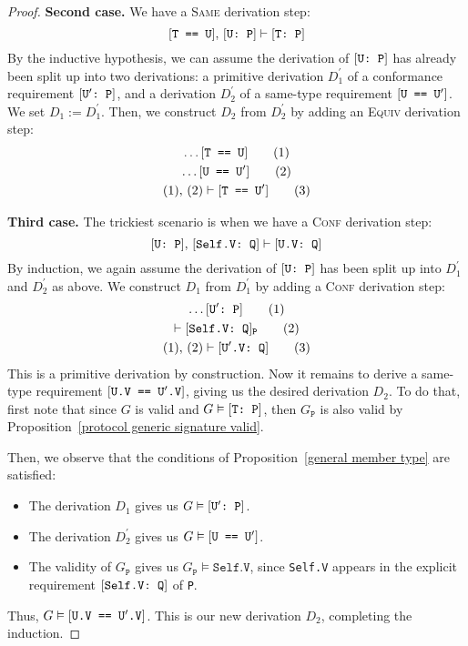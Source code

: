 \documentclass[../generics]{subfiles}
\begin{document}
\begin{proof}
\noindent \textbf{Second case.} We have a \textsc{Same} derivation step:
\[[\texttt{T == U}],\,[\texttt{U:~P}]\vdash[\texttt{T:~P}]\]
By the inductive hypothesis, we can assume the derivation of $[\texttt{U:~P}]$ has already been split up into two derivations: a primitive derivation $D_1^\prime$ of a conformance requirement $[\texttt{$\texttt{U}^\prime$:~P}]$, and a derivation $D_2^\prime$ of a same-type requirement $[\texttt{U == $\texttt{U}^\prime$}]$. We set $D_1:=D_1^\prime$. Then, we construct $D_2$ from $D_2^\prime$ by adding an \textsc{Equiv} derivation step:
\begin{gather*}
\ldots[\texttt{T == U}]\tag{1}\\
\ldots[\texttt{U == $\texttt{U}^\prime$}]\tag{2}\\
(1),\,(2)\vdash[\texttt{T == $\texttt{U}^\prime$}]\tag{3}
\end{gather*}

\noindent \textbf{Third case.} The trickiest scenario is when we have a \textsc{Conf} derivation step:
\[[\texttt{U:~P}],\,[\texttt{Self.V:~Q}]\vdash[\texttt{U.V:~Q}]\]
By induction, we again assume the derivation of $[\texttt{U:~P}]$ has been split up into $D_1^\prime$ and $D_2^\prime$ as above. We construct $D_1$ from $D_1^\prime$ by adding a \textsc{Conf} derivation step:
\begin{gather*}
\ldots[\texttt{$\texttt{U}^\prime$:~P}]\tag{1}\\
\vdash[\texttt{Self.V:~Q}]_\texttt{P}\tag{2}\\
(1),\,(2)\vdash[\texttt{$\texttt{U}^\prime$.V:~Q}]\tag{3}
\end{gather*}
This is a primitive derivation by construction. Now it remains to derive a same-type requirement $[\texttt{U.V == $\texttt{U}^\prime$.V}]$, giving us the desired derivation $D_2$. To do that, first note that since $G$ is valid and $G\vDash[\texttt{T:~P}]$, then $G_\texttt{P}$ is also valid by Proposition~\ref{protocol generic signature valid}.

Then, we observe that the conditions of Proposition~\ref{general member type} are satisfied:
\begin{itemize}
\item The derivation $D_1$ gives us $G\vDash[\texttt{$\texttt{U}^\prime$:~P}]$.
\item The derivation $D_2^\prime$ gives us $G\vDash[\texttt{U == $\texttt{U}^\prime$}]$.
\item The validity of $G_\texttt{P}$ gives us $G_\texttt{P}\vDash\texttt{Self.V}$, since \texttt{Self.V} appears in the explicit requirement $[\texttt{Self.V:~Q}]$ of \texttt{P}.
\end{itemize}
Thus, $G\vDash[\texttt{U.V == $\texttt{U}^\prime$.V}]$. This is our new derivation $D_2$, completing the induction.
\end{proof}
\end{document}
